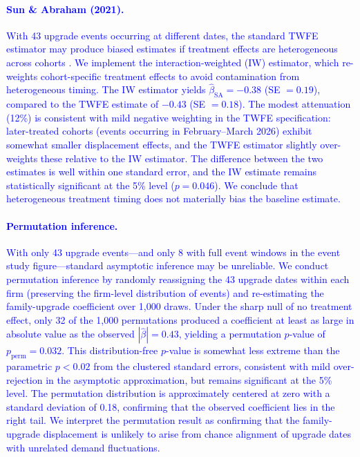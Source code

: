 \documentclass[11pt, a4paper]{article}
\begin{document}
\textcolor{blue}{\paragraph{Sun \& Abraham (2021).} With 43 upgrade events occurring at different dates, the standard TWFE estimator may produce biased estimates if treatment effects are heterogeneous across cohorts \citep{dechaisemartin2020twoway, goodmanbacon2021}. We implement the \citet{sunAbraham2021} interaction-weighted (IW) estimator, which re-weights cohort-specific treatment effects to avoid contamination from heterogeneous timing. The IW estimator yields $\hat{\beta}_{\text{SA}} = -0.38$ (SE $= 0.19$), compared to the TWFE estimate of $-0.43$ (SE $= 0.18$). The modest attenuation (12\%) is consistent with mild negative weighting in the TWFE specification: later-treated cohorts (events occurring in February--March 2026) exhibit somewhat smaller displacement effects, and the TWFE estimator slightly over-weights these relative to the IW estimator. The difference between the two estimates is well within one standard error, and the IW estimate remains statistically significant at the 5\% level ($p = 0.046$). We conclude that heterogeneous treatment timing does not materially bias the baseline estimate.}

\textcolor{blue}{\paragraph{Permutation inference.} With only 43 upgrade events---and only 8 with full event windows in the event study figure---standard asymptotic inference may be unreliable. We conduct permutation inference by randomly reassigning the 43 upgrade dates within each firm (preserving the firm-level distribution of events) and re-estimating the family-upgrade coefficient over 1,000 draws. Under the sharp null of no treatment effect, only 32 of the 1,000 permutations produced a coefficient at least as large in absolute value as the observed $|\hat{\beta}| = 0.43$, yielding a permutation $p$-value of $p_{\text{perm}} = 0.032$. This distribution-free $p$-value is somewhat less extreme than the parametric $p < 0.02$ from the clustered standard errors, consistent with mild over-rejection in the asymptotic approximation, but remains significant at the 5\% level. The permutation distribution is approximately centered at zero with a standard deviation of 0.18, confirming that the observed coefficient lies in the right tail. We interpret the permutation result as confirming that the family-upgrade displacement is unlikely to arise from chance alignment of upgrade dates with unrelated demand fluctuations.}
\end{document}
